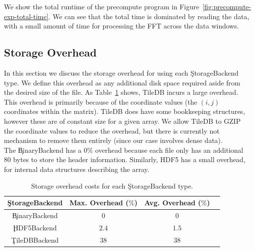 We show the total runtime of the precompute program in
Figure~\ref{fig:precompute-exp-total-time}. We can see that the total time is
dominated by reading the data, with a small amount of time for processing the
FFT across the data windows.


\subsection{Storage Overhead}

In this section we discuss the storage overhead for using each
\c{StorageBackend} type. We define this overhead as any additional disk space
required aside from the desired size of the file. As
Table~\ref{table:storage-overhead} shows, TileDB incurs a large overhead. This
overhead is primarily because of the coordinate values (the $(i,j)$ coordinates
within the matrix). TileDB does have some bookkeeping structures, however these
are of constant size for a given array. We allow TileDB to GZIP the coordinate
values to reduce the overhead, but there is currently not mechanism to remove
them entirely (since our case involves dense data). \\

The \c{BinaryBackend} has a $0\%$ overhead because each file only has an additional
80 bytes to store the header information. Similarly, HDF5 has a small overhead,
for internal data structures describing the array.

\begin{table}[h!]
\centering
 \begin{tabular}{|c |c |c |c|}
  \hline
  \c{StorageBackend} & Max. Overhead ($\%$) & Avg. Overhead ($\%$) \\
  \hline
  \c{BinaryBackend} & $0$ & $0$ \\
  \hline
  \c{HDF5Backend} & $2.4$ & $1.5$ \\
  \hline
  \c{TileDBBackend} & $38$ & $38$ \\
  \hline
\end{tabular}
\caption{Storage overhead costs for each \c{StorageBackend} type.}
\label{table:storage-overhead}
\end{table}

